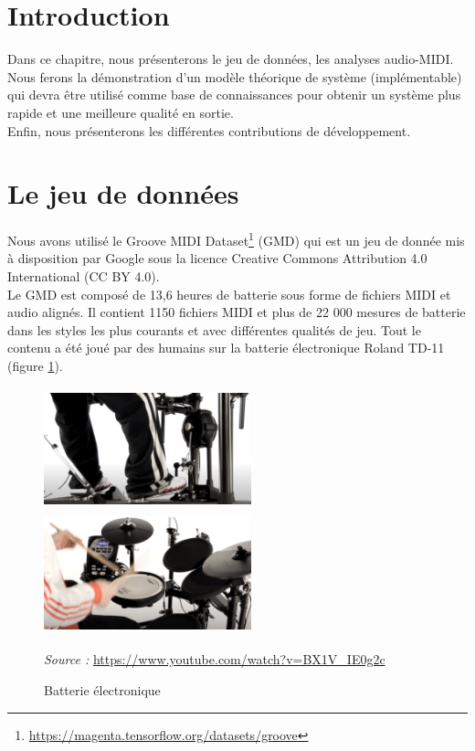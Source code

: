 \section*{Introduction}
Dans ce chapitre, nous présenterons le jeu de données, les analyses audio-MIDI.\\
Nous ferons la démonstration d’un modèle théorique de système (implémentable) qui devra être utilisé comme base de connaissances pour obtenir un système plus rapide et une meilleure qualité en sortie.\\
Enfin, nous présenterons les différentes contributions de développement.
\section{Le jeu de données}
Nous avons utilisé le Groove MIDI Dataset\footnote{\url{https://magenta.tensorflow.org/datasets/groove}} (GMD) qui est un jeu de donnée mis à disposition par Google sous la licence Creative Commons Attribution 4.0 International (CC BY 4.0).\\
Le GMD est composé de 13,6 heures de batterie sous forme de fichiers MIDI et audio alignés. Il contient 1150 fichiers MIDI et plus de 22 000 mesures de batterie dans les styles les plus courants et avec différentes qualités de jeu. Tout le contenu a été joué par des humains sur la batterie électronique Roland TD-11 (figure \ref{electro_drums}).\newpage
\begin{figure}[h]
	\centering
	\includegraphics[height=35mm, width=60mm]{z_images/4_experimentations/0_groove/0_roland.png}\ \ 
	\includegraphics[height=35mm, width=60mm]{z_images/4_experimentations/0_groove/1_roland.png}
	\caption{Batterie électronique}
	\label{electro_drums}
	\textit{Source :} \url{https://www.youtube.com/watch?v=BX1V_IE0g2c}
\end{figure}
